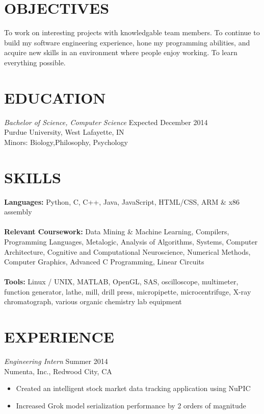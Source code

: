 \documentclass[margin,5pt]{res} %
\begin{document}
\address{vsinha@purdue.edu\\ vsinha.com \\github.com/vsinha}
\address{217 Pierce St. Unit 2 \\ West Lafayette, IN 47906\\(408) 505-1275}


\begin{resume}

 
\section{OBJECTIVES}To work on interesting projects with knowledgable team members. To continue to build
my software engineering experience, hone my programming abilities, and acquire new skills
in an environment where people enjoy working. To learn everything possible.

 

\section{EDUCATION} {\sl Bachelor of Science, Computer Science }\hfill Expected December 2014\\
               	 	    Purdue University, West Lafayette, IN\\
                	 	    Minors: Biology,Philosophy,  Psychology 
 

\section{SKILLS} {\bf Languages:} Python, C, C++, Java, JavaScript, HTML/CSS, ARM \& x86 assembly\\ \\
 		      {\bf Relevant Coursework:} Data Mining \& Machine Learning, Compilers, Programming Languages, Metalogic, Analysis of Algorithms, 
							Systems, Computer Architecture, Cognitive and Computational Neuroscience,
							Numerical Methods, Computer Graphics, Advanced C Programming, Linear Circuits\\ \\
		      {\bf Tools:} Linux / UNIX, MATLAB, OpenGL, SAS, oscilloscope, multimeter, function generator, lathe, mill, drill press, 
					micropipette, microcentrifuge, X-ray chromatograph, various organic chemistry lab equipment
 

\section{EXPERIENCE} {\sl Engineering Intern} \hfill Summer 2014\\
               Numenta, Inc., Redwood City, CA
                \begin{itemize} \itemsep -2pt
                \item Created an intelligent stock market data tracking application using NuPIC
                \item Increased Grok model serialization performance by 2 orders of magnitude
	       \end{itemize}



\end{resume}
\end{document}
